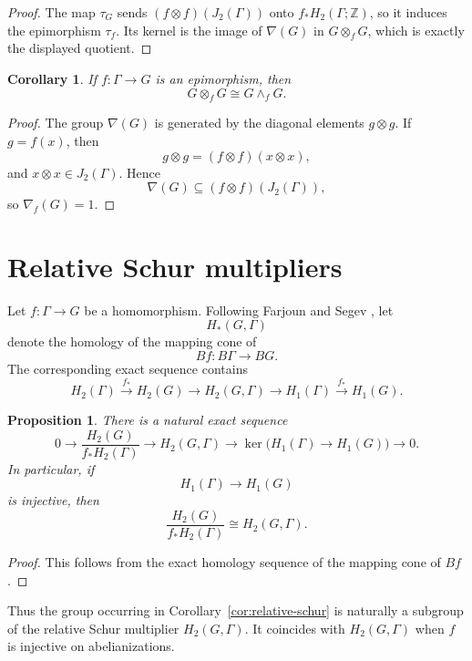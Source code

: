 \documentclass[10pt]{amsart}
\newtheorem{proposition}[theorem]{Proposition}
\newtheorem{corollary}[theorem]{Corollary}
\renewcommand{\*}{\cdot {\dots} \cdot}
\newcommand{\?}[1]{\overset{?}{#1}}
\numberwithin{equation}{section}
\begin{document}
\begin{proof}
The map $\tau_G$ sends
$(f\otimes f)(J_2(\Gamma))$ onto
$f_*H_2(\Gamma;\mathbb Z)$, so it induces the epimorphism
$\tau_f$. Its kernel is the image of $\nabla(G)$ in
$G\otimes_fG$, which is exactly the displayed quotient.
\end{proof}

\begin{corollary}\label{cor:relative-tensor-exterior-epi-f}
If $f\colon\Gamma\to G$ is an epimorphism, then
\[
G\otimes_fG\cong G\wedge_fG.
\]
\end{corollary}

\begin{proof}
The group $\nabla(G)$ is generated by the diagonal elements
$g\otimes g$. If $g=f(x)$, then
\[
g\otimes g=(f\otimes f)(x\otimes x),
\]
and $x\otimes x\in J_2(\Gamma)$. Hence
\[
\nabla(G)\subseteq(f\otimes f)(J_2(\Gamma)),
\]
so $\nabla_f(G)=1$.
\end{proof}


\section{Relative Schur multipliers}
\label{sec:relative-homology}

Let $f\colon\Gamma\to G$ be a homomorphism. Following
Farjoun and Segev \cite{FarjounSegev2017}, let
\[
H_*(G,\Gamma)
\]
denote the homology of the mapping cone of
\[
Bf\colon B\Gamma\longrightarrow BG.
\]
The corresponding exact sequence contains
\[
H_2(\Gamma)
\xrightarrow{\,f_*\,}
H_2(G)
\longrightarrow
H_2(G,\Gamma)
\longrightarrow
H_1(\Gamma)
\xrightarrow{\,f_*\,}
H_1(G).
\]

\begin{proposition}\label{prop:relative-schur-sequence}
There is a natural exact sequence
\[
0\longrightarrow
\frac{H_2(G)}{f_*H_2(\Gamma)}
\longrightarrow
H_2(G,\Gamma)
\longrightarrow
\ker\bigl(H_1(\Gamma)\to H_1(G)\bigr)
\longrightarrow0.
\]
In particular, if
\[
H_1(\Gamma)\longrightarrow H_1(G)
\]
is injective, then
\[
\frac{H_2(G)}{f_*H_2(\Gamma)}
\cong H_2(G,\Gamma).
\]
\end{proposition}

\begin{proof}
This follows from the exact homology sequence of the mapping
cone of $Bf$.
\end{proof}

Thus the group occurring in
Corollary~\ref{cor:relative-schur} is naturally a subgroup of
the relative Schur multiplier $H_2(G,\Gamma)$. It coincides
with $H_2(G,\Gamma)$ when $f$ is injective on abelianizations.
\end{document}
